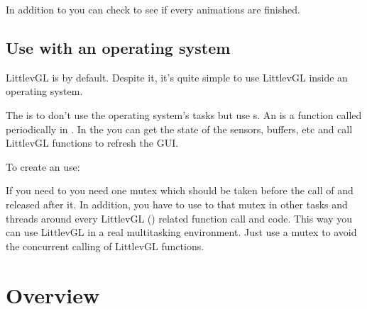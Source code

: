 \documentclass[letterpaper,10pt,english]{sphinxmanual}
\begin{document}
In addition to  you can check  to see if every animations are finished.


\section{Use with an operating system}
\label{\detokenize{porting/os:use-with-an-operating-system}}\label{\detokenize{porting/os::doc}}
LittlevGL is  by default. Despite it, it’s quite simple to use LittlevGL inside an operating system.

The  is to don’t use the operating system’s tasks but use s. An  is a function called periodically in .
In the  you can get the state of the sensors, buffers, etc and call LittlevGL functions to refresh the GUI.

To create an  use:

\begin{sphinxVerbatim}[commandchars=\\\{\}]
   
\end{sphinxVerbatim}

If you need to  you need one mutex which should be taken before the call of  and released after it.
In addition, you have to use to that mutex in other tasks and threads around every LittlevGL () related function call and code.
This way you can use LittlevGL in a real multitasking environment. Just use a mutex to avoid the concurrent calling of LittlevGL functions.


\chapter{Overview}
\label{\detokenize{overview/index:overview}}\label{\detokenize{overview/index::doc}}
\end{document}
